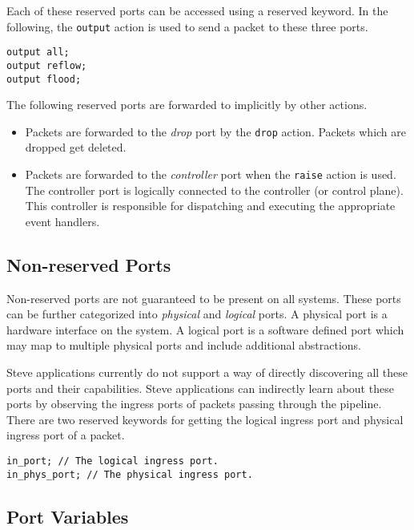 Each of these reserved ports can be accessed using a reserved keyword. In the
following, the \texttt{output} action is used to send a packet to these three
ports.

\begin{lstlisting}
output all;
output reflow;
output flood;
\end{lstlisting}

The following reserved ports are forwarded to implicitly by other actions.

\begin{itemize}
\item Packets are forwarded to the \textit{drop} port by the \texttt{drop} action.
Packets which are dropped get deleted.

\item Packets are forwarded to the \textit{controller} port when the 
\texttt{raise} action is used.
The controller port is logically connected to the controller (or control plane).
This controller is responsible for dispatching and executing the 
appropriate event handlers.
\end{itemize}

\subsection{Non-reserved Ports} \label{tut:regular_ports}

Non-reserved ports are not guaranteed to be present on all systems.
These ports can be further categorized into \textit{physical} and
\textit{logical} ports. A physical port is a hardware interface on the system. A
logical port is a software defined port which may map to multiple physical ports
and include additional abstractions.

Steve applications currently do not support a way of directly discovering all
these ports and their capabilities. Steve applications can indirectly learn
about these ports by observing the ingress ports of packets passing
through the pipeline.
There are two reserved keywords for getting the logical ingress port and physical ingress port of a packet.

\begin{lstlisting}
in_port; // The logical ingress port.
in_phys_port; // The physical ingress port.
\end{lstlisting}

\subsection{Port Variables} \label{tut:declared_ports}

